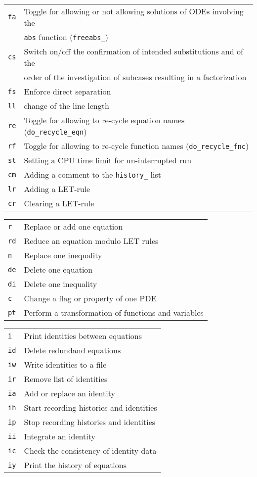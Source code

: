 \begin{longtable}[l]{ll}
  \texttt{fa} & Toggle for allowing or not allowing solutions of ODEs involving the \\
  & \texttt{abs} function (\texttt{freeabs\_}) \\
  \texttt{cs} & Switch on/off the confirmation of intended substitutions and of the \\
  & order of the investigation of subcases resulting in a factorization \\
  \texttt{fs} & Enforce direct separation \\
  \texttt{ll} & change of the line length \\
  \texttt{re} & Toggle for allowing to re-cycle equation names (\texttt{do\_recycle\_eqn}) \\
  \texttt{rf} & Toggle for allowing to re-cycle function names (\texttt{do\_recycle\_fnc}) \\
  \texttt{st} & Setting a CPU time limit for un-interrupted run \\
  \texttt{cm} & Adding a comment to the \texttt{history\_} list \\
  \texttt{lr} & Adding a LET-rule \\
  \texttt{cr} & Clearing a LET-rule
\end{longtable}


\begin{longtable}[l]{ll}
  \texttt{r}  & Replace or add one equation \\
  \texttt{rd} & Reduce an equation modulo LET rules \\
  \texttt{n}  & Replace one inequality \\
  \texttt{de} & Delete one equation \\
  \texttt{di} & Delete one inequality \\
  \texttt{c}  & Change a flag or property of one PDE \\
  \texttt{pt} & Perform a transformation of functions and variables
\end{longtable}


\begin{longtable}[l]{ll}
  \texttt{i}  & Print identities between equations \\
  \texttt{id} & Delete redundand equations \\
  \texttt{iw} & Write identities to a file \\
  \texttt{ir} & Remove list of identities \\
  \texttt{ia} & Add or replace an identity \\
  \texttt{ih} & Start recording histories and identities \\
  \texttt{ip} & Stop recording histories and identities \\
  \texttt{ii} & Integrate an identity \\
  \texttt{ic} & Check the consistency of identity data \\
  \texttt{iy} & Print the history of equations
\end{longtable}

